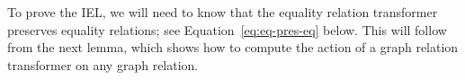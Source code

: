 \documentclass[runningheads]{llncs}
\newcommand{\set}{\mathsf{Set}}
\renewcommand{\id}{\mathit{id}}
\renewcommand{\id}{\mathit{id}}
\begin{document}
\begin{comment}
Just as the equality relation $\Eq_B$ on a set $B$ coincides with
$\graph{\id_B}$, the graph of the identity on the set, so we can
define the equality relation transformer to be the graph of the
identity natural transformation. This gives

\begin{definition}
Let $F : [\set^k, \set]$.  The equality relation transformer on $F$ is
defined to be $\Eq_F = \graph{\id_{F}}$. This entails that $Eq_F = (F,
F, \Eq_F^*)$ with $\Eq_F^* = \graph{\id_{F}}^*$.
\end{definition}
\end{comment}

To prove the IEL, we will need to know that the equality relation
transformer preserves equality relations; see
Equation~\ref{eq:eq-pres-eq} below. This will follow from the next
lemma, which shows how to compute the action of a graph relation
transformer on any graph relation.
\end{document}
